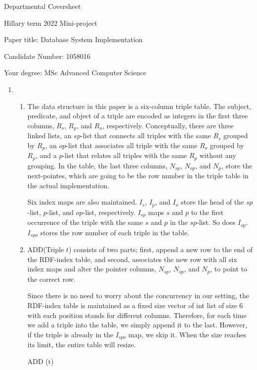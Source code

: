 \documentclass{article}
\begin{document}
Departmental Coversheet

Hillary term 2022
Mini-project

Paper title: Database System Implementation

Candidate Number: 1058016

Your degree: MSc Advanced Computer Science

\newpage

\begin{enumerate}
	\item 
	\begin{enumerate}
	\item 
	The data structure in this paper is a six-column triple table. The subject, predicate, and object of a triple are encoded as integers in the first three columns, $R_s$, $R_p$, and $R_o$, respectively. Conceptually, there are three linked lists, an $sp$-list that connects all triples with the same $R_s$ grouped by $R_p$, an $op$-list that associates all triple with the same $R_o$ grouped by $R_p$, and a $p$-list that relates all triples with the same $R_p$ without any grouping. In the table, the last three columns, $N_{sp}$, $N_{op}$, and $N_p$, store the next-pointes, which are going to be the row number in the triple table in the actual implementation.
	
	Six index maps are also maintained. $I_s$, $I_p$, and $I_o$ store the head of the $sp$-list, $p$-list, and $op$-list, respectively. $I_{sp}$ maps $s$ and $p$ to the first occurrence of the triple with the same $s$ and $p$ in the $sp$-list. So does $I_{op}$. $I_{spo}$ stores the row number of each triple in the table. 
	
	\item {\large A}DD(Triple $t$) consists of two parts; first, append a new row to the end of the RDF-index table, and second, associates the new row with all six index maps and alter the pointer columns, $N_{sp}$, $N_{op}$, and $N_p$, to point to the correct row.
	
	Since there is no need to worry about the concurrency in our setting, the RDF-index table is maintained as a fixed size vector of int list of size 6 with each position stands for different columns. Therefore, for each time we add a triple into the table, we simply append it to the last. However, if the triple is already in the $I_{spo}$ map, we skip it. When the size reaches its limit, the entire table will resize. 

\begin{algorithm}[H]
\caption{ADD (t)}\label{alg:cap}
\begin{algorithmic}


\end{algorithmic}
\end{algorithm}
\end{enumerate}
\end{enumerate}
\end{document}
